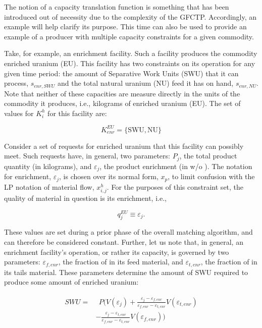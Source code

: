 The notion of a capacity translation function is something that has been
introduced out of necessity due to the complexity of the GFCTP. Accordingly, an
example will help clarify its purpose. This time can also be used to provide an
example of a producer with multiple capacity constraints for a given commodity.

Take, for example, an enrichment facility. Such a facility produces the
commodity enriched uranium (EU). This facility has two constraints on its
operation for any given time period: the amount of Separative Work Units (SWU)
that it can process, $s_{enr,SWU}$ and the total natural uranium (NU) feed it
has on hand, $s_{enr,NU}$. Note that neither of these capacities are measure
directly in the units of the commodity it produces, i.e., kilograms of enriched
uranium (EU). The set of values for $K_{i}^{h}$ for this facility are:

\begin{equation}\label{eqs:enr-constr-commods}
  K_{enr}^{EU} = \{ \mbox{SWU}, \mbox{NU} \}
\end{equation}

Consider a set of requests for enriched uranium that this facility can possibly
meet. Such requests have, in general, two parameters: $P_{j}$, the total product
quantity (in kilograms), and $\varepsilon_{j}$, the product enrichment (in w/o
). The notation for enrichment, $\varepsilon_{j}$, is chosen over its
normal form, $x_p$, to limit confusion with the LP notation of material flow,
$x^h_{i,j}$. For the purposes of this constraint set, the quality of material in
question is its enrichment, i.e.,

\begin{equation}\label{eqs:enr-q-swu}
  q_{j}^{EU} \equiv \varepsilon_{j}.
\end{equation}

These values are set during a prior phase of the overall matching algorithm, and
can therefore be considered constant. Further, let us note that, in general, an
enrichment facility's operation, or rather its capacity, is governed by two
parameters: $\varepsilon_{f,enr}$, the fraction of  in its feed material, and
$\varepsilon_{t,enr}$, the fraction of  in its tails material. These parameters
determine the amount of SWU required to produce some amount of enriched uranium:

\begin{align}
\begin{split}
\label{eqs:swu}
SWU = & \:\: P ( V(\varepsilon_{j}) 
      + \frac{\varepsilon_{j} - \varepsilon_{f,enr}}
               {\varepsilon_{f,enr} - \varepsilon_{t,enr}} V(\varepsilon_{t,enr}) \\
      & - \frac{\varepsilon_{j} - \varepsilon_{t,enr}}
               {\varepsilon_{f,enr} - \varepsilon_{t,enr}} V(\varepsilon_{f,enr}) )
\end{split}
\end{align}

